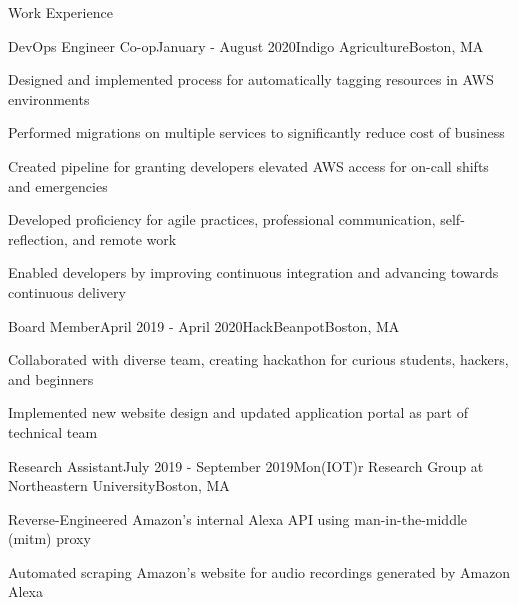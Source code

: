 \documentclass{resume}
\begin{document}
\begin{rSection}{Work Experience}

\begin{rSubsection}{DevOps Engineer Co-op}{January - August 2020}{Indigo Agriculture}{Boston, MA}
\item Designed and implemented process for automatically tagging resources in AWS environments
\item Performed migrations on multiple services to significantly reduce cost of business 
\item Created pipeline for granting developers elevated AWS access for on-call shifts and emergencies
\item Developed proficiency for agile practices, professional communication, self-reflection, and remote work
\item Enabled developers by improving continuous integration and advancing towards continuous delivery
\item
\end{rSubsection}

\begin{rSubsection}{Board Member}{April 2019 - April 2020}{HackBeanpot}{Boston, MA}
\item Collaborated with diverse team, creating hackathon for curious students, hackers, and beginners
\item Implemented new website design and updated application portal as part of technical team
\end{rSubsection}

\begin{rSubsection}{Research Assistant}{July 2019 - September 2019}{Mon(IOT)r Research Group at Northeastern University}{Boston, MA}
\item Reverse-Engineered Amazon's internal Alexa API using man-in-the-middle (mitm) proxy 
\item Automated scraping Amazon's website for audio recordings generated by Amazon Alexa
\end{rSubsection}
\end{rSection}
\end{document}
